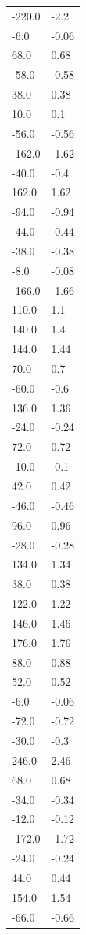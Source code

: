 \begin{longtable}{ll}
-220.0 & -2.2 \\
-6.0 & -0.06 \\
68.0 & 0.68 \\
-58.0 & -0.58 \\
38.0 & 0.38 \\
10.0 & 0.1 \\
-56.0 & -0.56 \\
-162.0 & -1.62 \\
-40.0 & -0.4 \\
162.0 & 1.62 \\
-94.0 & -0.94 \\
-44.0 & -0.44 \\
-38.0 & -0.38 \\
-8.0 & -0.08 \\
-166.0 & -1.66 \\
110.0 & 1.1 \\
140.0 & 1.4 \\
144.0 & 1.44 \\
70.0 & 0.7 \\
-60.0 & -0.6 \\
136.0 & 1.36 \\
-24.0 & -0.24 \\
72.0 & 0.72 \\
-10.0 & -0.1 \\
42.0 & 0.42 \\
-46.0 & -0.46 \\
96.0 & 0.96 \\
-28.0 & -0.28 \\
134.0 & 1.34 \\
38.0 & 0.38 \\
122.0 & 1.22 \\
146.0 & 1.46 \\
176.0 & 1.76 \\
88.0 & 0.88 \\
52.0 & 0.52 \\
-6.0 & -0.06 \\
-72.0 & -0.72 \\
-30.0 & -0.3 \\
246.0 & 2.46 \\
68.0 & 0.68 \\
-34.0 & -0.34 \\
-12.0 & -0.12 \\
-172.0 & -1.72 \\
-24.0 & -0.24 \\
44.0 & 0.44 \\
154.0 & 1.54 \\
-66.0 & -0.66 \\

\end{longtable}
